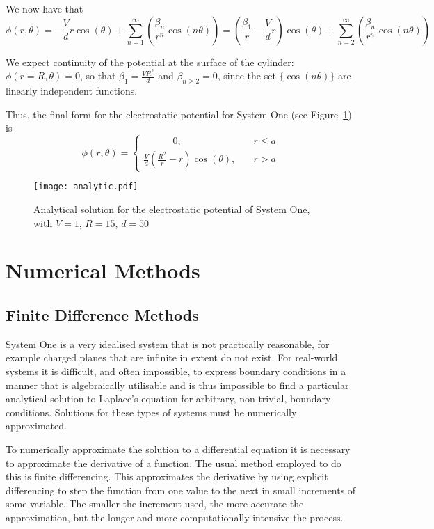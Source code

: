\documentclass[11pt, a4paper]{article}
\newcommand{\be}{\begin{equation}}
\newcommand{\ee}{\end{equation}}
\begin{document}
We now have that
%
\be
\phi(r,\theta)=-\frac{V}{d}r\cos(\theta) + \sum_{n=1}^{\infty}(\frac{\beta_n}{r^n} \cos(n\theta))
              =(\frac{\beta_1}{r}-\frac{V}{d}r)\cos(\theta) + \sum_{n=2}^{\infty}(\frac{\beta_n}{r^n} \cos(n\theta))
\ee

We expect continuity of the potential at the surface of the cylinder:
$\phi(r=R,\theta)=0$, so that $\beta_1=\frac{VR^2}{d}$ and $\beta_{n \geq 2}=0$,
since the set $\{\cos(n\theta)\}$ are linearly independent functions.

Thus, the final form for the electrostatic potential for System One (see
Figure~\ref{fig:analytic}) is
%
\be
\phi(r,\theta)=
\begin{cases} \quad \qquad 0, & \quad r \leq a \\
\frac{V}{d}(\frac{R^2}{r}-r)\cos(\theta), & \quad r > a
\end{cases}
\ee

\begin{figure}
\begin{center}
\texttt{[image: analytic.pdf]}
\caption{Analytical solution for the electrostatic potential of System One, with $V=1$,
$R=15$, $d=50$}
\label{fig:analytic}
\end{center}
\end{figure}

\section{Numerical Methods}
\subsection{Finite Difference Methods}

System One is a very idealised system that is not practically reasonable, for example
charged planes that are infinite in extent do not exist. For real-world systems
it is difficult, and often impossible, to express boundary conditions in a manner that
is algebraically utilisable and is thus impossible to find a particular analytical
solution to Laplace's equation for arbitrary, non-trivial, boundary conditions. Solutions
for these types of systems must be numerically approximated.

To numerically approximate the solution to a differential equation it is
necessary to approximate the derivative of a function. The usual method employed to
do this is finite differencing. This approximates the derivative by using explicit
differencing to step the function from one value to the next in small 
increments of some variable. The smaller the increment used, the more accurate
the approximation, but the longer and more computationally intensive the process.
\end{document}
